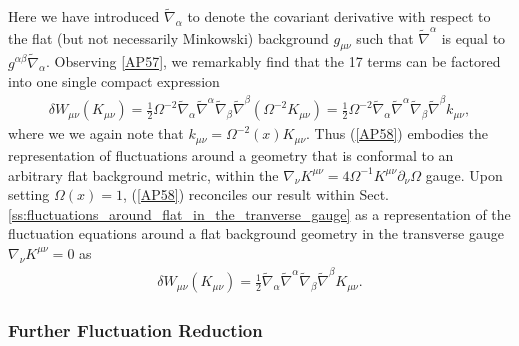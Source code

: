 %
Here we have introduced $\tilde{\nabla}_{\alpha}$ to denote the covariant derivative with respect to the flat (but not necessarily Minkowski) background $g_{\mu\nu}$ such that $\tilde{\nabla}^{\alpha}$ is equal to $g^{\alpha\beta}\tilde{\nabla}_{\alpha}$. Observing \eqref{AP57}, we remarkably find that the 17 terms can be factored into one single compact expression
%
\begin{eqnarray}
\delta W_{\mu\nu}(K_{\mu\nu})=\frac{1}{2}\Omega^{-2}\tilde{\nabla}_{\alpha}\tilde{\nabla}^{\alpha}\tilde{\nabla}_{\beta}\tilde{\nabla}^{\beta}(\Omega^{-2}K_{\mu\nu})
=\frac{1}{2}\Omega^{-2}\tilde{\nabla}_{\alpha}\tilde{\nabla}^{\alpha}\tilde{\nabla}_{\beta}\tilde{\nabla}^{\beta}k_{\mu\nu},
\label{AP58}
\end{eqnarray}
%
where we we again note that $k_{\mu\nu}=\Omega^{-2}(x)K_{\mu\nu}$. Thus (\ref{AP58}) embodies the representation of fluctuations around a geometry that is conformal to an arbitrary flat background metric, within the  $\nabla_{\nu}K^{\mu\nu}=4\Omega^{-1}K^{\mu\nu}\partial_{\nu}\Omega$ gauge. Upon setting $\Omega(x)=1$,  (\ref{AP58}) reconciles our result within Sect. \ref{ss:fluctuations_around_flat_in_the_tranverse_gauge} as a representation of the fluctuation equations around a flat background geometry in the transverse gauge $\nabla_{\nu}K^{\mu\nu}=0$ as 
%
\begin{eqnarray}
\delta W_{\mu\nu}(K_{\mu\nu})=\frac{1}{2}\tilde{\nabla}_{\alpha}\tilde{\nabla}^{\alpha}\tilde{\nabla}_{\beta}\tilde{\nabla}^{\beta}K_{\mu\nu}.
\label{AP59}
\end{eqnarray}
%

\subsubsection{Further Fluctuation Reduction}
\label{sss:obtaining_fluctuation_eqns_in_cgauge}

